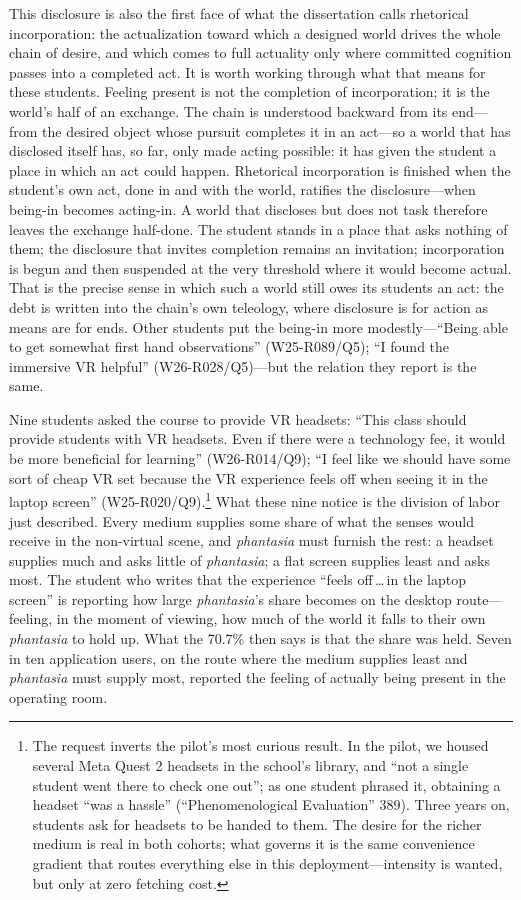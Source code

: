 This disclosure is also the first face of what the dissertation calls
rhetorical incorporation: the actualization toward which a designed
world drives the whole chain of desire, and which comes to full
actuality only where committed cognition passes into a completed act.
It is worth working through what that means for these students. Feeling
present is not the completion of incorporation; it is the world's half
of an exchange. The chain is understood backward from its end---from
the desired object whose pursuit completes it in an act---so a world
that has disclosed itself has, so far, only made acting possible: it
has given the student a place in which an act could happen. Rhetorical
incorporation is finished when the student's own act, done in and with
the world, ratifies the disclosure---when being-in becomes acting-in. A
world that discloses but does not task therefore leaves the exchange
half-done. The student stands in a place that asks nothing of them; the
disclosure that invites completion remains an invitation; incorporation
is begun and then suspended at the very threshold where it would become
actual. That is the precise sense in which such a world still owes its
students an act: the debt is written into the chain's own teleology,
where disclosure is for action as means are for ends. Other students
put the being-in more modestly---``Being able to get somewhat first
hand observations'' (W25-R089/Q5); ``I found the immersive VR helpful''
(W26-R028/Q5)---but the relation they report is the same.

Nine students asked the course to provide VR headsets: ``This class
should provide students with VR headsets. Even if there were a technology
fee, it would be more beneficial for learning'' (W26-R014/Q9); ``I feel
like we should have some sort of cheap VR set because the VR experience
feels off when seeing it in the laptop screen''
(W25-R020/Q9).\footnote{The request inverts the pilot's most curious
result. In the pilot, we housed several Meta Quest 2 headsets in the
school's library, and ``not a single student went there to check one
out''; as one student phrased it, obtaining a headset ``was a hassle''
(``Phenomenological Evaluation'' 389). Three years on, students ask for
headsets to be handed to them. The desire for the richer medium is real
in both cohorts; what governs it is the same convenience gradient that
routes everything else in this deployment---intensity is wanted, but only
at zero fetching cost.} What these nine notice is the division of labor
just described. Every medium supplies some share of what the senses would
receive in the non-virtual scene, and \textit{phantasia} must furnish the
rest: a headset supplies much and asks little of \textit{phantasia}; a
flat screen supplies least and asks most. The student who writes that the
experience ``feels off\,\ldots\,in the laptop screen'' is reporting how
large \textit{phantasia}'s share becomes on the desktop route---feeling,
in the moment of viewing, how much of the world it falls to their own
\textit{phantasia} to hold up. What the 70.7\% then says is that the
share was held. Seven in ten application users, on the route where the
medium supplies least and \textit{phantasia} must supply most, reported
the feeling of actually being present in the operating room.

